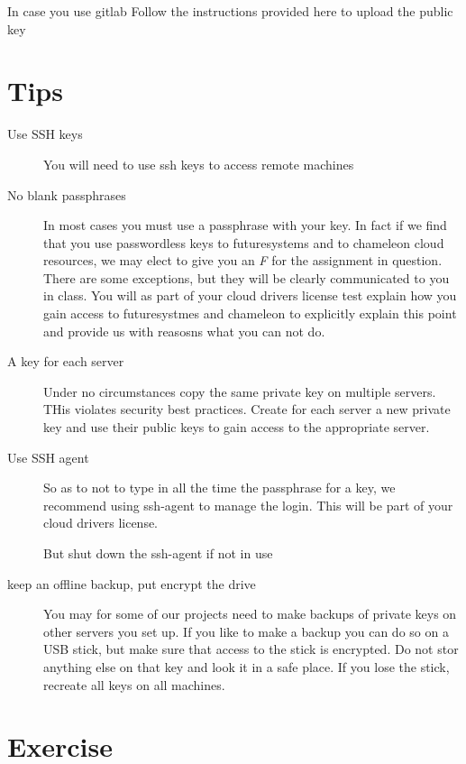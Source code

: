 In case you use gitlab  Follow the instructions provided here to
upload the public key


\section{Tips}

\begin{description}

\item[Use SSH keys] You will need to use ssh keys to access remote machines

\item[No blank passphrases] In most cases you must use a passphrase
  with your key. In fact if we find that you use passwordless keys to
  futuresystems and to chameleon cloud resources, we may elect to give
  you an {\em F} for the assignment in question. There are some
  exceptions, but they will be clearly communicated to you in
  class. You will as part of your cloud drivers license test explain
  how you gain access to futuresystmes and chameleon to explicitly
  explain this point and provide us with reasosns what you can not do.

\item[A key for each server] Under no circumstances copy the same
  private key on multiple servers. THis violates security best
  practices. Create for each server a new private key and use their
  public keys to gain access to the appropriate server.

\item[Use SSH agent] So as to not to type in all the time the
  passphrase for a key, we recommend using ssh-agent to manage the
  login. This will be part of your cloud drivers license.

But shut down the ssh-agent if not in use

\item[keep an offline backup, put encrypt the drive] You may for some
  of our projects need to make backups of private keys on other
  servers you set up. If you  like to make a backup you can do so on a
  USB stick, but make sure that access to the stick is encrypted. Do
  not stor anything else on that key and look it in a safe place. If
  you lose the stick, recreate all keys on all machines.

\end{description}

\section{Exercise}


